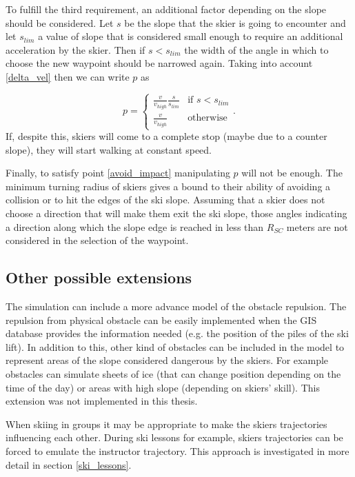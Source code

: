 \documentclass[12pt,a4paper,twoside]{book}
\begin{document}
To fulfill the third requirement, an additional factor depending on the slope should be considered. Let $s$ be the slope that the skier is going to encounter and let $s_{lim}$ a value of slope that is considered small enough to require an additional acceleration by the skier. Then if $s<s_{lim}$ the width of the angle in which to choose the new waypoint should be narrowed again. Taking into account \ref{delta_vel} then we can write $p$ as

\begin{equation}
p=\begin{cases}
   \frac{v}{v_{high}}\frac{s}{s_{lim}} & \text{if } s < s_{lim} \\
   \frac{v}{v_{high}} & \text{otherwise}
\end{cases}.
\end{equation}
If, despite this, skiers will come to a complete stop (maybe due to a counter slope), they will start walking at constant speed.

Finally, to satisfy point \ref{avoid_impact} manipulating $p$ will not be enough. The minimum turning radius of skiers gives a bound to their ability of avoiding a collision or to hit the edges of the ski slope. Assuming that a skier does not choose a direction that will make them exit the ski slope, those angles indicating a direction along which the slope edge is reached in less than $R_{SC}$ meters are not considered in the selection of the waypoint.

\subsection{Other possible extensions}
The simulation can include a more advance model of the obstacle repulsion. The repulsion from physical obstacle can be easily implemented when the GIS database provides the information needed (e.g. the position of the piles of the ski lift). In addition to this, other kind of obstacles can be included in the model to represent areas of the slope considered dangerous by the skiers. For example obstacles can simulate sheets of ice (that can change position depending on the time of the day) or areas with high slope (depending on skiers' skill). This extension was not implemented in this thesis.

When skiing in groups it may be appropriate to make the skiers trajectories influencing each other. During ski lessons for example, skiers trajectories can be forced to emulate the instructor trajectory. This approach is investigated in more detail in section \ref{ski_lessons}.
\end{document}
